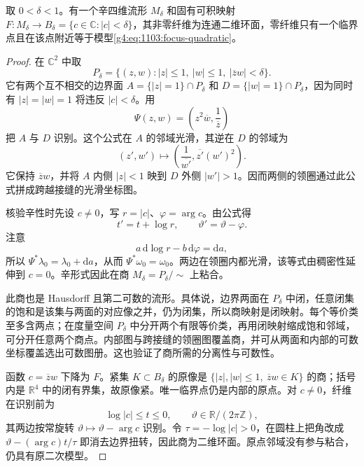 \begin{proposition}\label{g4:prop:1103:focus-gluing}
	取 \(0<\delta<1\)。有一个辛四维流形 \(M_\delta\) 和固有可积映射 \(F:M_\delta\to B_\delta=\{c\in\mathbb C:|c|<\delta\}\)，其非零纤维为连通二维环面，零纤维只有一个临界点且在该点附近等于模型\eqref{g4:eq:1103:focus-quadratic}。
\end{proposition}
\begin{proof}
	在 \(\mathbb C^2\) 中取
	\[
		P_\delta=\{(z,w):|z|\le1,\ |w|\le1,\ |\overline z w|<\delta\}.
	\]
	它有两个互不相交的边界面 \(A=\{|z|=1\}\cap P_\delta\) 和 \(D=\{|w|=1\}\cap P_\delta\)，因为同时有 \(|z|=|w|=1\) 将违反 \(|c|<\delta\)。用
	\begin{equation}\label{g4:eq:1103:focus-gluing-map}
		\Psi(z,w)=\left(z^2\overline w,\frac1{\overline z}\right)
	\end{equation}
	把 \(A\) 与 \(D\) 识别。这个公式在 \(A\) 的邻域光滑，其逆在 \(D\) 的邻域为
	\[
		(z',w')\longmapsto
		\left(\frac1{\overline{w'}},\overline{z'}(w')^2\right).
	\]
	它保持 \(\overline z w\)，并将 \(A\) 内侧 \(|z|<1\) 映到 \(D\) 外侧 \(|w'|>1\)。因而两侧的领圈通过此公式拼成跨越接缝的光滑坐标图。

	核验辛性时先设 \(c\ne0\)，写 \(r=|c|\)、\(\varphi=\arg c\)。由公式得
	\[
		t'=t+\log r,\qquad \vartheta'=\vartheta-\varphi.
	\]
	注意
	\[
		a\,\mathrm{d}\log r-b\,\mathrm{d}\varphi=\mathrm{d}a,
	\]
	所以 \(\Psi^*\lambda_0=\lambda_0+\mathrm{d}a\)，从而 \(\Psi^*\omega_0=\omega_0\)。两边在领圈内都光滑，该等式由稠密性延伸到 \(c=0\)。辛形式因此在商 \(M_\delta=P_\delta/{\sim}\) 上粘合。

	此商也是 Hausdorff 且第二可数的流形。具体说，边界两面在 \(P_\delta\) 中闭，任意闭集的饱和是该集与两面的对应像之并，仍为闭集，所以商映射是闭映射。每个等价类至多含两点；在度量空间 \(P_\delta\) 中分开两个有限等价类，再用闭映射缩成饱和邻域，可分开任意两个商点。内部图与跨接缝的领圈图覆盖商，并可从两面和内部的可数坐标覆盖选出可数图册。这也验证了商所需的分离性与可数性。

	函数 \(c=\overline z w\) 下降为 \(F\)。紧集 \(K\subset B_\delta\) 的原像是 \(\{|z|,|w|\le1,\ \overline z w\in K\}\) 的商；括号内是 \(\mathbb R^4\) 中的闭有界集，故原像紧。唯一临界点仍是内部的原点。对 \(c\ne0\)，纤维在识别前为
	\[
		\log|c|\le t\le0,\qquad \vartheta\in\mathbb R/(2\pi\mathbb Z),
	\]
	其两边按常旋转 \(\vartheta\mapsto\vartheta-\arg c\) 识别。令 \(\tau=-\log|c|>0\)，在圆柱上把角改成 \(\vartheta-(\arg c)t/\tau\) 即消去边界扭转，因此商为二维环面。原点邻域没有参与粘合，仍具有原二次模型。
\end{proof}

